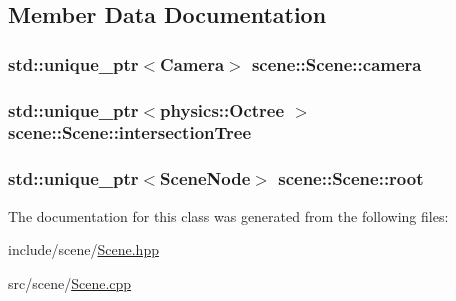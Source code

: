\subsection{Member Data Documentation}
\hypertarget{classscene_1_1Scene_a6e76d3ce0d9372b30ea7798ace438f41}{
\subsubsection[{camera}]{\setlength{\rightskip}{0pt plus 5cm}std\-::unique\-\_\-ptr$<${\bf Camera}$>$ scene\-::\-Scene\-::camera}}\label{classscene_1_1Scene_a6e76d3ce0d9372b30ea7798ace438f41}
\hypertarget{classscene_1_1Scene_a777f60164480fc00fa3931a8b08495a5}{
\subsubsection[{intersection\-Tree}]{\setlength{\rightskip}{0pt plus 5cm}std\-::unique\-\_\-ptr$<${\bf physics\-::\-Octree} $>$ scene\-::\-Scene\-::intersection\-Tree}}\label{classscene_1_1Scene_a777f60164480fc00fa3931a8b08495a5}
\hypertarget{classscene_1_1Scene_ad64e692101bece140472f85bd7da19b8}{
\subsubsection[{root}]{\setlength{\rightskip}{0pt plus 5cm}std\-::unique\-\_\-ptr$<${\bf Scene\-Node}$>$ scene\-::\-Scene\-::root}}\label{classscene_1_1Scene_ad64e692101bece140472f85bd7da19b8}


The documentation for this class was generated from the following files\-:\begin{DoxyCompactItemize}
\item 
include/scene/\hyperlink{Scene_8hpp}{Scene.\-hpp}\item 
src/scene/\hyperlink{Scene_8cpp}{Scene.\-cpp}\end{DoxyCompactItemize}
